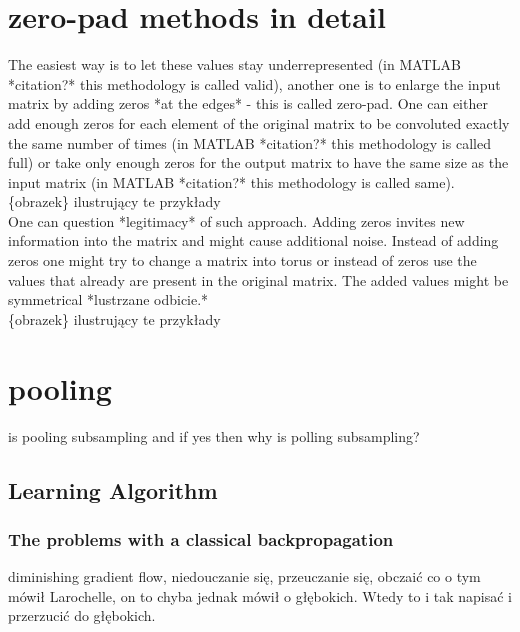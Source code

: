 \documentclass[a4paper,10pt]{report}
\begin{document}
    \section{zero-pad methods in detail}
      The easiest way is to let these values stay underrepresented (in MATLAB *citation?* this methodology is called valid), another one is to enlarge the input matrix by adding zeros *at the edges* - this is called zero-pad. One can either add enough zeros for each element of the original matrix to be convoluted exactly the same number of times (in MATLAB *citation?* this methodology is called full) or take only enough zeros for the output matrix to have the same size as the input matrix (in MATLAB *citation?* this methodology is called same).\\
	  
      \{obrazek\} ilustrujący te przykłady \\
	  
      One can question *legitimacy* of such approach. Adding zeros invites new information into the matrix and might cause additional noise. Instead of adding zeros one might try to change a matrix into torus or instead of zeros use the values that already are present in the original matrix. The added values might be symmetrical *lustrzane odbicie.*\\
	  
      \{obrazek\} ilustrujący te przykłady 
      
    \section{pooling}	  
      is pooling subsampling and if yes then why is polling subsampling?\\
      
     
	  
	
	\subsection{Learning Algorithm} %
	
	
	\subsubsection{The problems with a classical backpropagation} %
	  diminishing gradient flow, niedouczanie się, przeuczanie się, obczaić co o tym mówił Larochelle, on to chyba jednak mówił o głębokich. Wtedy to i tak napisać i przerzucić do głębokich.\\
	
\end{document}
